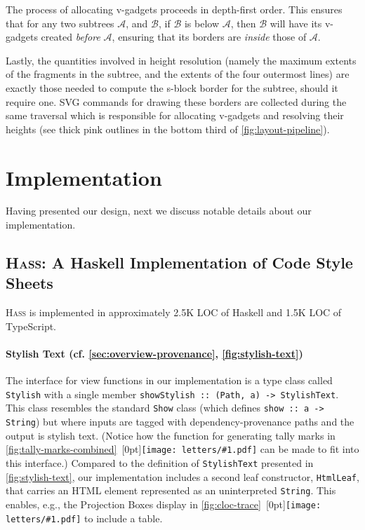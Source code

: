\documentclass[acmsmall, screen]{acmart}
\newcommand{\parahead}[1]
  {\paragraph{\textbf{#1}}}
\newcommand{\hass}
{\textsc{Hass}}
\newcommand{\figBubble}[1]{\raisebox{-0.03in}[0pt]{\texttt{[image: letters/\#1.pdf]}}}
\newcommand{\refBubble}[1]
  {~\figBubble{#1}}
\begin{document}
The process of allocating v-gadgets proceeds in depth-first order. This ensures that for any two subtrees $\mathcal{A}$, and $\mathcal{B}$, if $\mathcal{B}$ is below $\mathcal{A}$, then $\mathcal{B}$ will have its v-gadgets created \textit{before} $\mathcal{A}$, ensuring that its borders are \textit{inside} those of $\mathcal{A}$.



Lastly, the quantities involved in height resolution (namely the maximum extents of the fragments in the subtree, and the extents of the four outermost lines) are exactly those needed to compute the s-block border for the subtree, should it require one.
SVG commands for drawing these borders are collected during the same traversal which is responsible for allocating v-gadgets and resolving their heights (see thick pink outlines in the bottom third of \autoref{fig:layout-pipeline}).

 
\section{Implementation}
\label{sec:hass}



Having presented our design, next we discuss notable details about our implementation.




\subsection{\hass{}: A Haskell Implementation of Code Style Sheets}

\hass{} is implemented in approximately 2.5K LOC of Haskell and 1.5K LOC of TypeScript. 

\parahead{Stylish Text (cf. \autoref{sec:overview-provenance}, \autoref{fig:stylish-text})}



The interface for view functions in our implementation is a type class called \texttt{Stylish} with a single member \texttt{showStylish :: (Path, a) -> StylishText}. This class resembles the standard \texttt{Show} class (which defines \verb+show :: a -> String+) but where inputs are tagged with dependency-provenance paths and the output is stylish text. (Notice how the function for generating tally marks in \autoref{fig:tally-marks-combined}\refBubble{b} can be made to fit into this interface.)
Compared to the definition of \texttt{StylishText} presented in \autoref{fig:stylish-text}, our implementation includes a second leaf constructor, \texttt{HtmlLeaf}, that
carries an HTML element represented as an uninterpreted \texttt{String}.
This enables, e.g., the Projection Boxes display in \autoref{fig:cloc-trace}\refBubble{e} to include a table.
\end{document}
